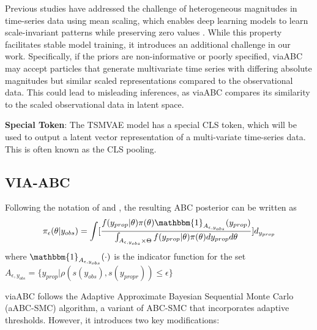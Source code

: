 \documentclass[12pt]{article} %
\begin{document}
Previous studies have addressed the challenge of heterogeneous magnitudes in time-series data using mean scaling, which enables deep learning models to learn scale-invariant patterns while preserving zero values \citep{ansari2024chronos}. While this property facilitates stable model training, it introduces an additional challenge in our work. Specifically, if the priors are non-informative or poorly specified, viaABC may accept particles that generate multivariate time series with differing absolute magnitudes but similar scaled representations compared to the observational data. This could lead to misleading inferences, as viaABC compares its similarity to the scaled observational data in latent space. 

\textbf{Special Token}: The TSMVAE model has a special CLS token, which will be used to output a latent vector representation of a multi-variate time-series data. This is often known as the CLS pooling. 



\subsection{VIA-ABC}
Following the notation of \citep{marin2012approximate} and \citep{simola2021adaptive}, the resulting ABC posterior can be written as
$$
\pi_{\epsilon}(\theta | y_{obs}) = \int [\frac{f(y_{prop} | \theta)\pi(\theta)\mathbbm{1}_{A_{\epsilon, y_{obs}}}(y_{prop})}{\int_{A_{\epsilon, y_{obs}} \times \Theta } f(y_{prop} | \theta)\pi(\theta)dy_{prop}d\theta}]d_{y_{prop}}
$$
where $\mathbbm{1}_{A_{\epsilon, y_{obs}}}(\cdot)$ is the indicator function for the set $A_{\epsilon, y_{obs}} = \{y_{prop} | \rho (s(y_{obs}), s(y_{propr})) \leq \epsilon\}$

viaABC follows the Adaptive Approximate Bayesian Sequential Monte Carlo (aABC-SMC) algorithm, a variant of ABC-SMC that incorporates adaptive thresholds. However, it introduces two key modifications: 
\end{document}
